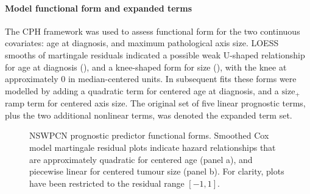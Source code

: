 \documentclass[dissertation.tex]{subfiles}
\begin{document}
\paragraph{Model functional form and expanded terms}
The \gls{CPH} framework was used to assess functional form for the two continuous covariates: age at diagnosis, and maximum pathological axis size.  \gls{LOESS} smooths of martingale residuals \cite{Therneau1990} indicated a possible weak U-shaped relationship for age at diagnosis (), and a knee-shaped form for size (), with the knee at approximately $0$ in median-centered units.  In subsequent fits these forms were modelled by adding a quadratic term for centered age at diagnosis, and a $\mbox{size}_+$ ramp term for centered axis size.  The original set of five linear prognostic terms, plus the two additional nonlinear terms, was denoted the expanded term set.

\begin{figure}
\centering
\caption[Prognostic predictor functional forms]{\gls{NSWPCN} prognostic predictor functional forms. Smoothed Cox model martingale residual plots indicate hazard relationships that are approximately quadratic for centered age (panel a), and piecewise linear for centered tumour size (panel b).  For clarity, plots have been restricted to the residual range $[-1,1]$.}
\label{fig:nomo-funcform}
\end{figure}
\end{document}
